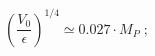 \begin{equation}
\label{eq:COBEdec}
\left(\frac{V_0}{\epsilon}\right)^{1/4} \simeq 0.027 \cdot M_P \;; 
\end{equation}

